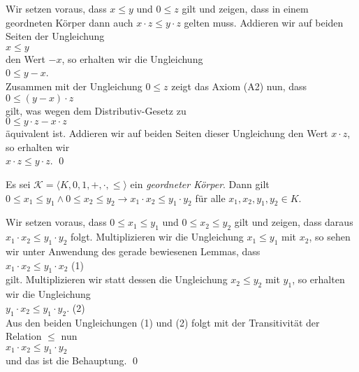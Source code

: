 \proof
Wir setzen voraus, dass  $x \leq y$ und $0 \leq z$ gilt und zeigen, dass in einem geordneten
K\"orper dann auch $x \cdot z \leq y \cdot z$ gelten muss.  Addieren wir auf beiden Seiten der Ungleichung
\\[0.2cm]
\hspace*{1.3cm}
$x \leq y$
\\[0.2cm]
den Wert $-x$, so erhalten wir die Ungleichung
\\[0.2cm]
\hspace*{1.3cm}
$0 \leq y - x$.
\\[0.2cm]
Zusammen mit der Ungleichung $0 \leq z$ zeigt das Axiom (A2) nun, dass
\\[0.2cm]
\hspace*{1.3cm}
$0 \leq (y - x) \cdot z$
\\[0.2cm]
gilt, was wegen dem Distributiv-Gesetz zu
\\[0.2cm]
\hspace*{1.3cm}
$0 \leq y \cdot z - x \cdot z$
\\[0.2cm]
\"aquivalent ist.  Addieren wir auf beiden Seiten dieser Ungleichung den Wert $x \cdot z$, so erhalten wir
\\[0.2cm]
\hspace*{1.3cm}
$x \cdot z \leq y \cdot z$.  \qed

\begin{Lemma} \label{lemma:l6}
  Es sei  $\mathcal{K} = \langle K, 0, 1, +, \cdot, \leq \rangle$ ein \emph{geordneter K\"orper}.
  Dann gilt
  \\[0.2cm]
  \hspace*{1.3cm} $0 \leq x_1 \leq y_1 \wedge 0 \leq x_2 \leq y_2 \rightarrow x_1 \cdot x_2 \leq y_1 \cdot y_2$  
  \quad f\"ur alle $x_1,x_2,y_1,y_2 \in K$.
\end{Lemma}

\proof
Wir setzen voraus, dass $0 \leq x_1 \leq y_1$ und $0 \leq x_2 \leq y_2$ gilt und zeigen, dass daraus 
$x_1 \cdot x_2 \leq y_1 \cdot y_2$ folgt.  Multiplizieren wir die Ungleichung $x_1 \leq y_1$ mit
$x_2$, so sehen wir unter Anwendung des gerade bewiesenen Lemmas, dass
\\[0.2cm]
\hspace*{1.3cm}
$x_1 \cdot x_2 \leq y_1 \cdot x_2$  \hspace*{\fill} (1)
\\[0.2cm]
gilt.  Multiplizieren wir statt dessen die Ungleichung $x_2 \leq y_2$ mit $y_1$, so erhalten wir die
Ungleichung 
\\[0.2cm]
\hspace*{1.3cm}
$y_1 \cdot x_2 \leq y_1 \cdot y_2$. \hspace*{\fill} (2)
\\[0.2cm]
Aus den beiden Ungleichungen (1) und (2) folgt mit der Transitivit\"at der Relation $\leq$ nun
\\[0.2cm]
\hspace*{1.3cm}
$x_1 \cdot x_2 \leq y_1 \cdot y_2$
\\[0.2cm]
und das ist die Behauptung.  \qed

